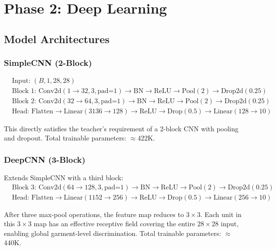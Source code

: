 \documentclass[conference]{IEEEtran}
\begin{document}
\section{Phase 2: Deep Learning}\label{sec:phase2}

\subsection{Model Architectures}

\subsubsection{SimpleCNN (2-Block)}

\begin{align*}
&\text{Input: } (B, 1, 28, 28) \\
&\text{Block 1: } \text{Conv2d}(1{\to}32, 3, \text{pad=1}) \to \text{BN} \to \text{ReLU} \to \text{Pool}(2) \to \text{Drop2d}(0.25) \\
&\text{Block 2: } \text{Conv2d}(32{\to}64, 3, \text{pad=1}) \to \text{BN} \to \text{ReLU} \to \text{Pool}(2) \to \text{Drop2d}(0.25) \\
&\text{Head: Flatten} \to \text{Linear}(3136{\to}128) \to \text{ReLU} \to \text{Drop}(0.5) \to \text{Linear}(128{\to}10)
\end{align*}

This directly satisfies the teacher's requirement of a 2-block CNN with
pooling and dropout. Total trainable parameters: ${\approx}$422K.

\subsubsection{DeepCNN (3-Block)}

Extends SimpleCNN with a third block:
\begin{align*}
&\text{Block 3: } \text{Conv2d}(64{\to}128, 3, \text{pad=1}) \to \text{BN} \to \text{ReLU} \to \text{Pool}(2) \to \text{Drop2d}(0.25) \\
&\text{Head: Flatten} \to \text{Linear}(1152{\to}256) \to \text{ReLU} \to \text{Drop}(0.5) \to \text{Linear}(256{\to}10)
\end{align*}

After three max-pool operations, the feature map reduces to $3\times3$.
Each unit in this $3\times3$ map has an effective receptive field covering
the entire $28\times28$ input, enabling global garment-level discrimination.
Total trainable parameters: ${\approx}$440K.
\end{document}
